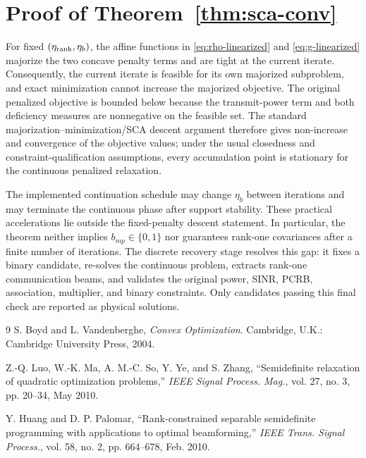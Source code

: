\documentclass[12pt,a4paper]{article}
\begin{document}
\section{Proof of Theorem~\ref{thm:sca-conv}}\label{app:proof-sca-conv}

For fixed $(\eta_{\rm rank},\eta_b)$, the affine functions in \eqref{eq:rho-linearized} and \eqref{eq:g-linearized} majorize the two concave penalty terms and are tight at the current iterate. Consequently, the current iterate is feasible for its own majorized subproblem, and exact minimization cannot increase the majorized objective. The original penalized objective is bounded below because the transmit-power term and both deficiency measures are nonnegative on the feasible set. The standard majorization--minimization/SCA descent argument therefore gives non-increase and convergence of the objective values; under the usual closedness and constraint-qualification assumptions, every accumulation point is stationary for the continuous penalized relaxation.

The implemented continuation schedule may change $\eta_b$ between iterations and may terminate the continuous phase after support stability. These practical accelerations lie outside the fixed-penalty descent statement. In particular, the theorem neither implies $b_{mp}\in\{0,1\}$ nor guarantees rank-one covariances after a finite number of iterations. The discrete recovery stage resolves this gap: it fixes a binary candidate, re-solves the continuous problem, extracts rank-one communication beams, and validates the original power, SINR, PCRB, association, multiplier, and binary constraints. Only candidates passing this final check are reported as physical solutions.

\begin{thebibliography}{9}
S. Boyd and L. Vandenberghe, \emph{Convex Optimization}. Cambridge, U.K.: Cambridge University Press, 2004.

Z.-Q. Luo, W.-K. Ma, A. M.-C. So, Y. Ye, and S. Zhang, ``Semidefinite relaxation of quadratic optimization problems,'' \emph{IEEE Signal Process. Mag.}, vol. 27, no. 3, pp. 20--34, May 2010.

Y. Huang and D. P. Palomar, ``Rank-constrained separable semidefinite programming with applications to optimal beamforming,'' \emph{IEEE Trans. Signal Process.}, vol. 58, no. 2, pp. 664--678, Feb. 2010.
\end{thebibliography}
\end{document}
